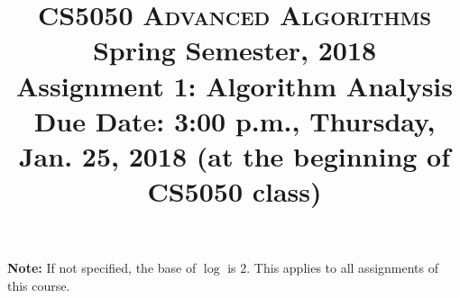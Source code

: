 \documentclass[11pt]{article}
\begin{document}
\baselineskip=14.0pt
\title{CS5050 \textsc{Advanced Algorithms}
\\{\Large Spring Semester, 2018}
\\ Assignment 1: Algorithm Analysis
\\ {\large {\bf Due Date:} {\bf 3:00 p.m.}, Thursday, Jan. 25, 2018 ({\bf at the beginning of CS5050 class})}}
\date{}

\maketitle

\vspace{-0.5in}

{\bf Note:} If not specified, the base of $\log$ is $2$. This applies to all assignments of this course.
\end{document}
